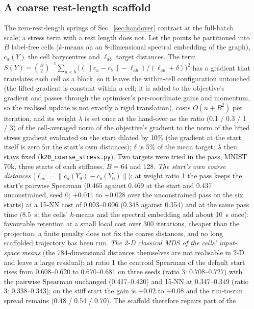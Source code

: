\documentclass[11pt]{article}
\begin{document}
\subsection{A coarse rest-length scaffold}\label{sec:scaffold}
The zero-rest-length springs of Sec.~\ref{sec:handover} contract at the full-batch scale; a stress term
with a rest length does not. Let the points be partitioned into $B$ label-free cells ($k$-means on an
8-dimensional spectral embedding of the graph), $c_a(Y)$ the cell barycentres and $\ell_{ab}$ target
distances. The term $S(Y) = \binom{B}{2}^{-1} \sum_{a < b} \big((\|c_a - c_b\| - \ell_{ab}) / (\ell_{ab} +
\delta)\big)^2$ has a gradient that translates each cell as a block, so it leaves the within-cell
configuration untouched (the lifted gradient is constant within a cell; it is added to the objective's
gradient and passes through the optimiser's per-coordinate gains and momentum, so the realised update is
not exactly a rigid translation), costs $O(n + B^2)$ per iteration, and its weight $\lambda$ is set once at
the hand-over as the ratio (0.1 / 0.3 / 1 / 3) of the cell-averaged norm of the objective's gradient to
the norm of the lifted stress gradient evaluated on the start dilated by 10\% (the gradient at the start
itself is zero for the start's own distances); $\delta$ is 5\% of the mean target; $\lambda$ then stays
fixed (\texttt{k20\_coarse\_stress.py}).
Two targets were tried in the pass, MNIST 70k, three starts of each stiffness, $B = 64$ and 128.
\emph{The start's own coarse distances} ($\ell_{ab} = \|c_a(Y_0) - c_b(Y_0)\|$): at weight ratio 1 the
pass keeps the start's pairwise Spearman (0.465 against 0.469 at the start and 0.437 unconstrained,
seed 0; $+0.011$ to $+0.028$ over the unconstrained pass on the six starts) at a 15-NN cost of
0.003--0.006 (0.348 against 0.354) and at the same pass time (8.5~s; the cells' $k$-means and the
spectral embedding add about 10~s once): favourable retention at a small local cost over 300 iterations,
cheaper than the projection; a finite penalty does not fix the coarse distances, and no long scaffolded
trajectory has been run. \emph{The 2-D classical MDS of the cells'
input-space means} (the 784-dimensional distances themselves are not realisable in 2-D and leave a
large residual): at ratio 1 the centroid Spearman of the default start rises from 0.608--0.620 to
0.670--0.681 on three seeds (ratio 3: 0.708--0.727) with the pairwise Spearman unchanged (0.417--0.420)
and 15-NN at 0.347--0.349 (ratio 3: 0.338--0.343); on the stiff start the gain is $+0.02$ to $+0.08$ and
the run-to-run spread remains (0.48 / 0.54 / 0.70). The scaffold therefore repairs part of the
\end{document}
